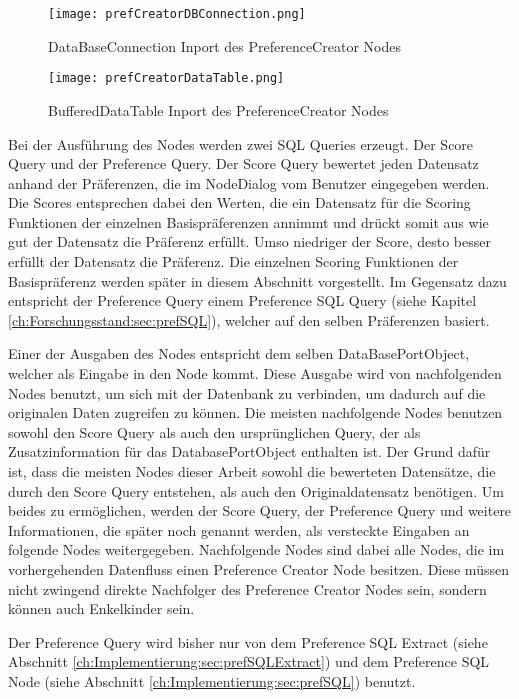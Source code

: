 \begin{figure}[H]
	\centering
	\texttt{[image: prefCreatorDBConnection.png]}
	\caption{DataBaseConnection Inport des PreferenceCreator Nodes}
	\label{img:prefCreatorDBConnection}
\end{figure}

\begin{figure}[H]
	\centering
	\texttt{[image: prefCreatorDataTable.png]}
	\caption{BufferedDataTable Inport des PreferenceCreator Nodes}
	\label{img:prefCreatorDataTable}
\end{figure}

Bei der Ausführung des Nodes werden zwei SQL Queries erzeugt. Der Score Query und der Preference Query. Der Score Query bewertet jeden Datensatz anhand der Präferenzen, die im NodeDialog vom Benutzer eingegeben werden. Die Scores entsprechen dabei den Werten, die ein Datensatz für die Scoring Funktionen der einzelnen Basispräferenzen annimmt und drückt somit aus wie gut der Datensatz die Präferenz erfüllt. Umso niedriger der Score, desto besser erfüllt der Datensatz die Präferenz. Die einzelnen Scoring Funktionen der Basispräferenz werden später in diesem Abschnitt vorgestellt.
Im Gegensatz dazu entspricht der Preference Query einem Preference SQL Query (siehe Kapitel \ref{ch:Forschungsstand:sec:prefSQL}), welcher auf den selben Präferenzen basiert. 

Einer der Ausgaben des Nodes entspricht dem selben DataBasePortObject, welcher als Eingabe in den Node kommt. Diese Ausgabe wird von nachfolgenden Nodes benutzt, um sich mit der Datenbank zu verbinden, um dadurch auf die originalen Daten zugreifen zu können. Die meisten nachfolgende Nodes benutzen sowohl den Score Query als auch den ursprünglichen Query, der als  Zusatzinformation für das DatabasePortObject enthalten ist. Der Grund dafür ist, dass die meisten Nodes dieser Arbeit sowohl die bewerteten Datensätze, die durch den Score Query entstehen, als auch den Originaldatensatz benötigen. Um beides zu ermöglichen, werden der Score Query, der Preference Query und weitere Informationen, die später noch genannt werden, als versteckte Eingaben an folgende Nodes weitergegeben. Nachfolgende Nodes sind dabei alle Nodes, die im vorhergehenden Datenfluss einen Preference Creator Node besitzen. Diese müssen nicht zwingend direkte Nachfolger des Preference Creator Nodes sein, sondern können auch Enkelkinder sein.

Der Preference Query wird bisher nur von dem Preference SQL Extract (siehe Abschnitt \ref{ch:Implementierung:sec:prefSQLExtract}) und dem Preference SQL Node (siehe Abschnitt \ref{ch:Implementierung:sec:prefSQL}) benutzt. 

